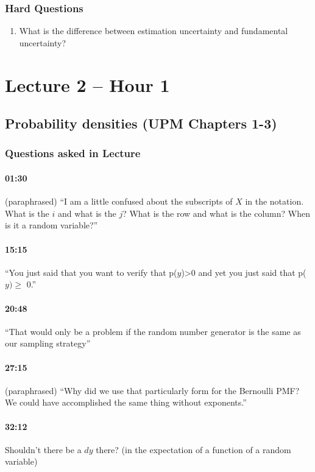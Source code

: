 \documentclass[11pt]{article}
\begin{document}
\subsubsection{Hard Questions}

\begin{enumerate}
\item What is the difference between estimation uncertainty and fundamental uncertainty?
\end{enumerate}

\section{Lecture 2 -- Hour 1}

\subsection{Probability densities (UPM Chapters 1-3)}

\subsubsection{Questions asked in Lecture}

\paragraph{01:30} (paraphrased) ``I am a little confused about the subscripts of $X$ in the notation.  What is the $i$ and what is the $j$?  What is the row and what is the column? When is it a random variable?''
\paragraph{15:15} ``You just said that you want to verify that p($y$)>0 and yet you just said that p($y)\geq$ 0.''
\paragraph{20:48} ``That would only be a problem if the random number generator is the same as our sampling strategy''
\paragraph{27:15} (paraphrased) ``Why did we use that particularly form for the Bernoulli PMF?  We could have accomplished the same thing without exponents.''
\paragraph{32:12} Shouldn't there be a $dy$ there? (in the expectation of a function of a random variable)
\end{document}

